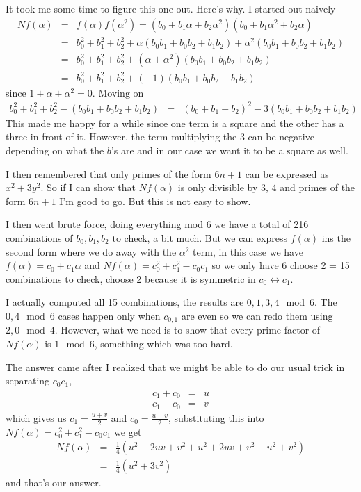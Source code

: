 \documentclass[aps,preprint,preprintnumbers,nofootinbib,showpacs,prd]{revtex4-1}
\newcommand{\nbea}{\begin{eqnarray*}}
\newcommand{\neea}{\end{eqnarray*}}
\begin{document}
It took me some time to figure this one out. Here's why. I started out naively
%
\nbea
Nf(\alpha) & = & f(\alpha)f(\alpha^2) = (b_0 + b_1\alpha + b_2\alpha^2)(b_0 + b_1\alpha^2 + b_2\alpha) \\
& = & b_0^2 + b_1^2 + b_2^2 + \alpha(b_0b_1 + b_0b_2 + b_1b_2) + \alpha^2(b_0b_1 + b_0b_2 + b_1b_2) \\
& = & b_0^2 + b_1^2 + b_2^2 + (\alpha + \alpha^2)(b_0b_1 + b_0b_2 + b_1b_2)\\
& = & b_0^2 + b_1^2 + b_2^2 + (-1)(b_0b_1 + b_0b_2 + b_1b_2)
\neea
%
since $1 + \alpha + \alpha^2 = 0$. Moving on
%
\nbea
b_0^2 + b_1^2 + b_2^2 - (b_0b_1 + b_0b_2 + b_1b_2) & = & (b_0 + b_1 + b_2)^2 - 3 (b_0b_1 + b_0b_2 + b_1b_2)
\neea
%
This made me happy for a while since one term is a square and the other has a three in front of it. However, the term multiplying the 3 can be negative depending on what the $b$'s are and in our case we want it to be a square as well.

I then remembered that only primes of the form $6n + 1$ can be expressed as $x^2 + 3y^2$. So if I can show that $Nf(\alpha)$ is only divisible by 3, 4 and primes of the form $6n + 1$ I'm good to go. But this is not easy to show.

I then went brute force, doing everything mod 6 we have a total of 216 combinations of $b_0, b_1, b_2$ to check, a bit much.  But we can express $f(\alpha)$ ins the second form where we do away with the $\alpha^2$ term, in this case we have $f(\alpha) = c_0 + c_1\alpha$ and $Nf(\alpha) = c_0^2+  c_1^2 - c_0c_1$ so we only have 6 choose 2 = 15 combinations to check, choose 2 because it is symmetric in $c_0 \leftrightarrow c_1$.

I actually computed all 15 combinations, the results are $0,1,3,4 \mod{6}$. The $0,4 \mod{6}$ cases happen only when $c_{0,1}$ are even so we can redo them using $2,0 \mod{4}$. However, what we need is to show that every prime factor of $Nf(\alpha)$ is $1 \mod{6}$, something which was too hard.

The answer came after I realized that we might be able to do our usual trick in separating $c_0c_1$, 
%
\nbea
c_1 + c_0 & = & u \\
c_1 - c_0 & = & v
\neea
%
which gives us $c_1 = \frac{u + v}{2}$ and $c_0 = \frac{u - v}{2}$, substituting this into $Nf(\alpha) = c_0^2 + c_1^2 - c_0c_1$ we get
%
\nbea
Nf(\alpha) & = & \frac{1}{4} (u^2  - 2uv + v^2 + u^2 + 2uv + v^2 - u^2 + v^2) \\
& = & \frac{1}{4} (u^2 + 3v^2)
\neea
%
and that's our answer.
\end{document}
